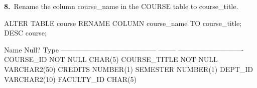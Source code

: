 
\noindent\begin{minipage}{\linewidth}
\begingroup{}
{\fontsize{14}{17}\selectfont\textbf{8.}}\ Rename the column course\_name in the COURSE table to course\_title.\par
\endgroup\vspace{12pt}


\begin{sqlcode}
ALTER TABLE course RENAME COLUMN course_name TO course_title;
DESC course;
\end{sqlcode}

\vspace{18pt}


\begin{sqlout}
 Name                                      Null?    Type
 ----------------------------------------- -------- ----------------------------
 COURSE_ID                                 NOT NULL CHAR(5)
 COURSE_TITLE                              NOT NULL VARCHAR2(50)
 CREDITS                                            NUMBER(1)
 SEMESTER                                           NUMBER(1)
 DEPT_ID                                            VARCHAR2(10)
 FACULTY_ID                                         CHAR(5)
\end{sqlout}
\end{minipage}\par\vspace{30pt}

